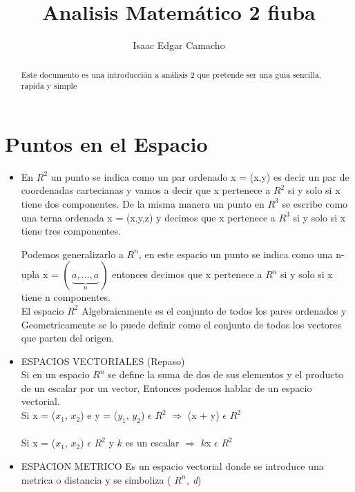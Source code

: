 \documentclass[a4paper,16pt]{article}
\title{Analisis Matem\'atico 2 fiuba}
\author{Isaac Edgar Camacho}
\begin{document}
\maketitle

\begin{abstract}
Este documento es una introducci\'on a an\'alisis 2 que pretende ser una guia sencilla, rapida y simple
\end{abstract}

\tableofcontents

\section{Puntos en el Espacio}

\begin{itemize}
    \item En $R^{2}$ un punto se indica como un par ordenado x = (x,y) es decir	un par de coordenadas cartecianas y vamos a decir que x pertenece a $R^{2}$ si y solo si x  tiene dos componentes.
		De la misma manera un punto en $R^{3}$ se escribe como una terna ordenada x = (x,y,z) y 				decimos que x pertenece a $R^{3}$ si y solo si x tiene tres componentes.
		
		Podemos generalizarlo a $R^{n}$, en este espacio un punto se indica como una n-upla 
		x = $(\,\underbrace{a,\ldots, a}_{n}\,)$ entonces decimos que x pertenece a $R^{n}$ si y solo si x tiene n componentes.
\\		El espacio $R^{2}$ Algebraicamente es el conjunto de todos los pares ordenados y 						Geometricamente se lo puede definir como el conjunto de todos los vectores que parten 		del origen.

    \item ESPACIOS VECTORIALES (Repaso)
\\   Si en un espacio $R^{n}$ se define la suma de dos de sus elementos y el producto de un escalar por un vector, Entonces podemos hablar de un espacio vectorial.
\\   Si x = ($x_{1}$, $x_{2}$) e y = ($y_{1}$, $y_{2}$) $\epsilon$ $R^{2}$ $\Rightarrow$ (x + y) $\epsilon$ $R^{2}$ 
\\
\\
 Si x = ($x_{1}$, $x_{2}$) $\epsilon$ $R^{2}$ y $k$ es un escalar  $\Rightarrow$ $k$x  $\epsilon$ $R^{2}$ 

    \item ESPACION METRICO
Es un espacio vectorial donde se introduce una metrica o distancia y se simboliza  (\textit{ $R^{n}$, d})


\end{itemize}
\end{document}
